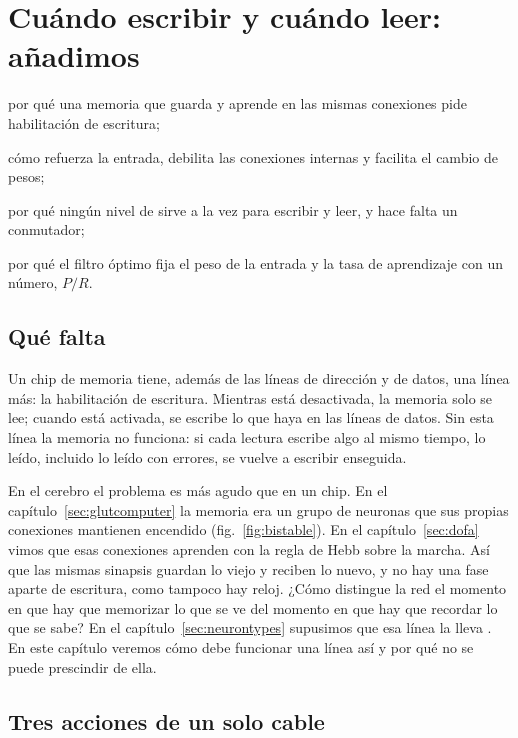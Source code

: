 \chapter{Cuándo escribir y cuándo leer: añadimos }
\label{sec:acet}
\begin{chaptergoals}
\item por qué una memoria que guarda y aprende en las mismas conexiones pide habilitación de escritura;
\item cómo  refuerza la entrada, debilita las conexiones internas y facilita el cambio de pesos;
\item por qué ningún nivel de  sirve a la vez para escribir y leer, y hace falta un conmutador;
\item por qué el filtro óptimo fija el peso de la entrada y la tasa de aprendizaje con un número, $P/R$.
\end{chaptergoals}

\section{Qué falta}

Un chip de memoria tiene, además de las líneas de dirección y de datos, una línea más: la habilitación de escritura. Mientras está desactivada, la memoria solo se lee; cuando está activada, se escribe lo que haya en las líneas de datos. Sin esta línea la memoria no funciona: si cada lectura escribe algo al mismo tiempo, lo leído, incluido lo leído con errores, se vuelve a escribir enseguida.

En el cerebro el problema es más agudo que en un chip. En el capítulo~\ref{sec:glutcomputer} la memoria era un grupo de neuronas  que sus propias conexiones mantienen encendido (fig.~\ref{fig:bistable}). En el capítulo~\ref{sec:dofa} vimos que esas conexiones aprenden con la regla de Hebb sobre la marcha. Así que las mismas sinapsis guardan lo viejo y reciben lo nuevo, y no hay una fase aparte de escritura, como tampoco hay reloj. ¿Cómo distingue la red el momento en que hay que memorizar lo que se ve del momento en que hay que recordar lo que se sabe? En el capítulo~\ref{sec:neurontypes} supusimos que esa línea la lleva . En este capítulo veremos cómo debe funcionar una línea así y por qué no se puede prescindir de ella.

\section{Tres acciones de un solo cable}

